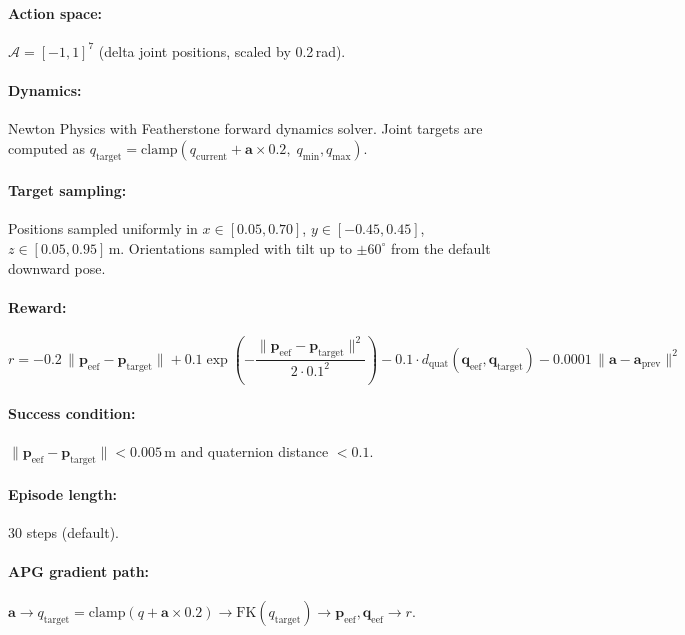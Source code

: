 \documentclass[11pt,a4paper]{article}
\newcommand{\cA}{\mathcal{A}}
\newcommand{\bpf}{\mathbf{p}}
\newcommand{\ba}{\mathbf{a}}
\begin{document}
\paragraph{Action space:} $\cA = [-1, 1]^7$ (delta joint positions, scaled by 0.2\,rad).

\paragraph{Dynamics:} Newton Physics with Featherstone forward dynamics solver. Joint targets are computed as $q_{\text{target}} = \text{clamp}(q_{\text{current}} + \ba \times 0.2, \; q_{\text{min}}, q_{\text{max}})$.

\paragraph{Target sampling:} Positions sampled uniformly in $x \in [0.05, 0.70]$, $y \in [-0.45, 0.45]$, $z \in [0.05, 0.95]$\,m. Orientations sampled with tilt up to $\pm 60^\circ$ from the default downward pose.

\paragraph{Reward:}
\begin{equation}
  r = -0.2\,\|\bpf_{\text{eef}} - \bpf_{\text{target}}\| + 0.1\exp\!\left(-\frac{\|\bpf_{\text{eef}} - \bpf_{\text{target}}\|^2}{2 \cdot 0.1^2}\right) - 0.1 \cdot d_{\text{quat}}(\mathbf{q}_{\text{eef}}, \mathbf{q}_{\text{target}}) - 0.0001\,\|\ba - \ba_{\text{prev}}\|^2
  \label{eq:fr_reward}
\end{equation}

\paragraph{Success condition:} $\|\bpf_{\text{eef}} - \bpf_{\text{target}}\| < 0.005$\,m and quaternion distance $< 0.1$.

\paragraph{Episode length:} 30 steps (default).

\paragraph{APG gradient path:} $\ba \rightarrow q_{\text{target}} = \text{clamp}(q + \ba \times 0.2) \rightarrow \text{FK}(q_{\text{target}}) \rightarrow \bpf_{\text{eef}}, \mathbf{q}_{\text{eef}} \rightarrow r$.
\end{document}
